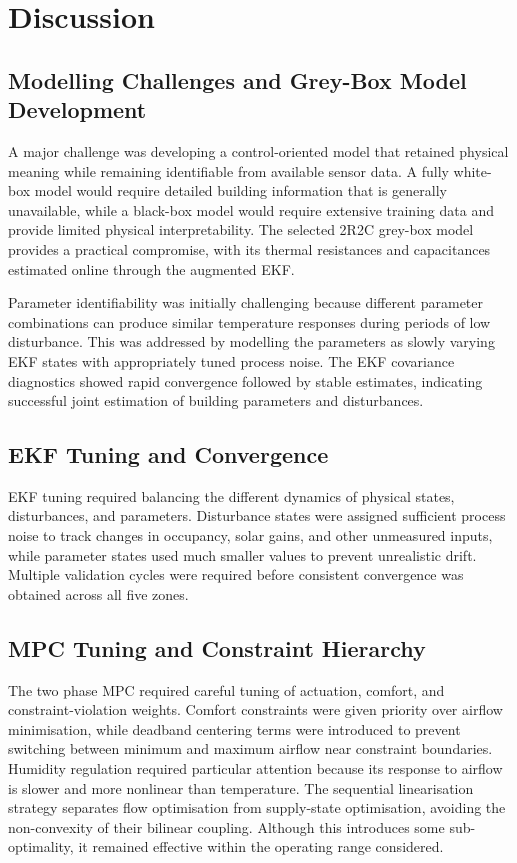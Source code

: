 \documentclass[12pt, a4paper]{article}
\begin{document}
\newpage
\section{Discussion}

\subsection{Modelling Challenges and Grey-Box Model Development}

A major challenge was developing a control-oriented model that retained physical meaning while remaining identifiable from available sensor data. A fully white-box model would require detailed building information that is generally unavailable, while a black-box model would require extensive training data and provide limited physical interpretability. The selected 2R2C grey-box model provides a practical compromise, with its thermal resistances and capacitances estimated online through the augmented EKF.

Parameter identifiability was initially challenging because different parameter combinations can produce similar temperature responses during periods of low disturbance. This was addressed by modelling the parameters as slowly varying EKF states with appropriately tuned process noise. The EKF covariance diagnostics showed rapid convergence followed by stable estimates, indicating successful joint estimation of building parameters and disturbances.

\subsection{EKF Tuning and Convergence}

EKF tuning required balancing the different dynamics of physical states, disturbances, and parameters. Disturbance states were assigned sufficient process noise to track changes in occupancy, solar gains, and other unmeasured inputs, while parameter states used much smaller values to prevent unrealistic drift. Multiple validation cycles were required before consistent convergence was obtained across all five zones.

\subsection{MPC Tuning and Constraint Hierarchy}

The two phase MPC required careful tuning of actuation, comfort, and constraint-violation weights. Comfort constraints were given priority over airflow minimisation, while deadband centering terms were introduced to prevent switching between minimum and maximum airflow near constraint boundaries. Humidity regulation required particular attention because its response to airflow is slower and more nonlinear than temperature. The sequential linearisation strategy separates flow optimisation from supply-state optimisation, avoiding the non-convexity of their bilinear coupling. Although this introduces some sub-optimality, it remained effective  within the operating range considered.
\end{document}
